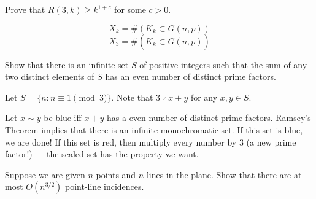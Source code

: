 \documentclass[10pt, a4paper]{article}
\begin{document}
\newpage
\begin{prob}
	Prove that $R(3, k) \geqslant k^{1+c}$ for some $c > 0$.
\end{prob}
\begin{sk}
	\[
		X_k = \#(K_k \subset G(n, p))
	\]
	\[
		X_3 = \#(K_k \subset \overline{G(n, p)})
	\]
\end{sk}

\newpage
\begin{prob}
	Show that there is an infinite set $S$ of positive integers such that the sum of any two distinct elements of $S$ has an even number of distinct prime factors.
\end{prob}
\begin{sol}
	Let $S = \{n : n \equiv 1 \pmod{3}\}$. Note that $3 \nmid x + y$ for any $x, y \in S$.

	Let $x \sim y$ be blue iff $x + y$ has a even number of distinct prime factors. Ramsey's Theorem implies that there is an infinite monochromatic set. If this set is blue, we are done! If this set is red, then multiply every number by $3$ (a new prime factor!) --- the scaled set has the property we want.
\end{sol}

\newpage
\begin{prob}
	Suppose we are given $n$ points and $n$ lines in the plane. Show that there are at most $O(n^{3/2})$ point-line incidences.
\end{prob}
\begin{sol}
	
\end{sol}
\end{document}
